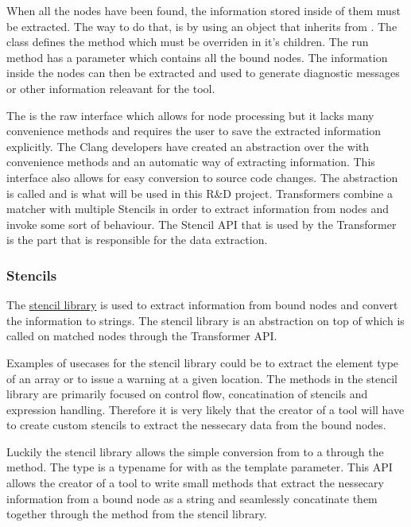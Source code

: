When all the nodes have been found, the information stored inside of them must be extracted. The way to do that, is by using an object that inherits from . The  class defines the  method which must be overriden in it's children. The run method has a  parameter which contains all the bound nodes. The information inside the nodes can then be extracted and used to generate diagnostic messages or other information releavant for the tool.

The  is the raw interface which allows for node processing but it lacks many convenience methods and requires the user to save the extracted information explicitly. The Clang developers have created an abstraction over the  with convenience methods and an automatic way of extracting information. This interface also allows for easy conversion to source code changes. The abstraction is called  and is what will be used in this R\&D project. Transformers combine a matcher with multiple Stencils in order to extract information from nodes and invoke some sort of behaviour. The Stencil API that is used by the Transformer is the part that is responsible for the data extraction. 

\subsubsection*{Stencils} \label{subsec:080dev:stencils}

The \href{https://github.com/llvm/llvm-project/blob/main/clang/include/clang/Tooling/Transformer/Stencil.h}{stencil library} is used to extract information from bound nodes and convert the information to strings.  The stencil library is an abstraction on top of  which is called on matched nodes through the Transformer API. 

Examples of usecases for the stencil library could be to extract the element type of an array or to issue a warning at a given location. The methods in the stencil library are primarily focused on control flow, concatination of stencils and expression handling. Therefore it is very likely that the creator of a tool will have to create custom stencils to extract the nessecary data from the bound nodes.

Luckily the stencil library allows the simple conversion from  to a  through the  method. The  type is a typename for  with  as the template parameter. This API allows the creator of a tool to write small methods that extract the nessecary information from a bound node as a string and seamlessly concatinate them together through the  method from the stencil library.

